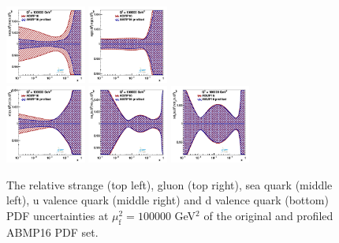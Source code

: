 \documentclass[pdftex,twocolumn,epjc3]{svjour3}          %
\newcommand{\abmp} {ABMP16\xspace}
\begin{document}
\begin{figure}
    \centering
    {{\includegraphics[width=0.235\textwidth]{pics/pdf-profile-ffabm/q2_100000_pdf_s_ratio.pdf}}}
    {{\includegraphics[width=0.235\textwidth]{pics/pdf-profile-ffabm/q2_100000_pdf_g_ratio.pdf}}}\\
    {{\includegraphics[width=0.235\textwidth]{pics/pdf-profile-ffabm/q2_100000_pdf_Sea_ratio.pdf}}}
    {{\includegraphics[width=0.235\textwidth]{pics/pdf-profile-ffabm/q2_100000_pdf_uv_ratio.pdf}}}
    {{\includegraphics[width=0.235\textwidth]{pics/pdf-profile-ffabm/q2_100000_pdf_dv_ratio.pdf}}}
    \caption{The relative strange (top left), gluon (top right), sea quark (middle left), u valence quark (middle right) and d valence quark (bottom) PDF uncertainties at $\mu_\mathrm{f}^2=100000$ GeV$^2$ of the original and profiled \abmp PDF set.}
    \label{fig:pdf-abmp-100000}
\end{figure}
\end{document}
